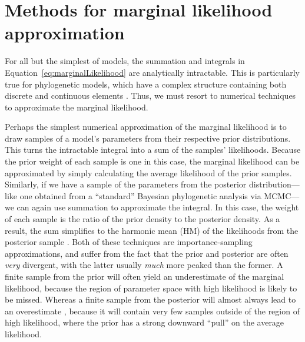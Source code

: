 \section{Methods for marginal likelihood approximation}

For all but the simplest of models, the summation and integrals in
Equation~\ref{eq:marginalLikelihood}
are analytically intractable.
This is particularly true for phylogenetic models, which have a complex
structure containing both discrete and continuous elements \citep{Kim2000}.
Thus, we must resort to numerical techniques to approximate the marginal
likelihood.

Perhaps the simplest numerical approximation of the marginal likelihood is to
draw samples of a model's parameters from their respective prior distributions.
This turns the intractable integral into a sum of the samples' likelihoods.
Because the prior weight of each sample is one in this case, the marginal
likelihood can be approximated by simply calculating the average likelihood of
the prior samples.
Similarly, if we have a sample of the parameters from the posterior
distribution---like one obtained from a ``standard'' Bayesian phylogenetic
analysis via MCMC---we can again use summation to approximate the integral.
In this case, the weight of each sample is the ratio of the prior density to
the posterior density.
As a result, the sum simplifies to the harmonic mean (HM) of the likelihoods
from the posterior sample \citep{Newton1994}.
Both of these techniques are importance-sampling approximations, and suffer
from the fact that the prior and posterior are often \emph{very} divergent,
with the latter usually \emph{much} more peaked than the former.
A finite sample from the prior will often yield an underestimate of the
marginal likelihood, because the region of parameter space with high likelihood
is likely to be missed.
Whereas a finite sample from the posterior will almost always lead to an
overestimate \citep{Lartillot2006,Xie2011,Fan2011}, because it will contain
very few samples outside of the region of high likelihood, where the prior has
a strong downward ``pull'' on the average likelihood.

